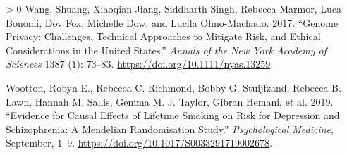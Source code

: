 \documentclass[
]{article}
\theoremstyle{plain}
\newlength{\cslhangindent}
\newenvironment{CSLReferences}[3] %
 {%
  \setlength{\parindent}{0pt}
  \ifodd #1 \everypar{\setlength{\hangindent}{\cslhangindent}}\ignorespaces\fi
  \ifnum #2 > 0
  \setlength{\parskip}{#2\baselineskip}
  \fi
 }%
 {}
\begin{document}
\begin{CSLReferences}{1}{0}
\leavevmode\hypertarget{ref-wang_genome_2017}{}%
Wang, Shuang, Xiaoqian Jiang, Siddharth Singh, Rebecca Marmor, Luca Bonomi, Dov Fox, Michelle Dow, and Lucila Ohno-Machado. 2017. {``Genome Privacy: Challenges, Technical Approaches to Mitigate Risk, and Ethical Considerations in the {United States}.''} \emph{Annals of the New York Academy of Sciences} 1387 (1): 73--83. \url{https://doi.org/10.1111/nyas.13259}.

\leavevmode\hypertarget{ref-wootton_evidence_2019}{}%
Wootton, Robyn E., Rebecca C. Richmond, Bobby G. Stuijfzand, Rebecca B. Lawn, Hannah M. Sallis, Gemma M. J. Taylor, Gibran Hemani, et al. 2019. {``Evidence for Causal Effects of Lifetime Smoking on Risk for Depression and Schizophrenia: A {Mendelian} Randomisation Study.''} \emph{Psychological Medicine}, September, 1--9. \url{https://doi.org/10.1017/S0033291719002678}.

\end{CSLReferences}
\end{document}
